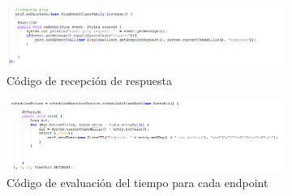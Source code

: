 \documentclass[12pt, twoside]{book}
\begin{document}
\begin{itemize}
\begin{figure}[H]
\begin{subfigure}{.5\textwidth}
  \centering
  \includegraphics[scale=0.4]{images/response_pig}
  \caption{Código de recepción de respuesta}
  \label{fig:sfig1}
\end{subfigure}
\begin{subfigure}{.5\textwidth}
  \centering
  \includegraphics[scale=0.35]{images/capture_difference}
  \caption{Código de evaluación del tiempo para cada endpoint}
  \label{fig:sfig1}
\end{subfigure}
\begin{subfigure}{.5\textwidth}
  \centering

\end{subfigure}
\end{figure}
\end{itemize}
\end{document}

